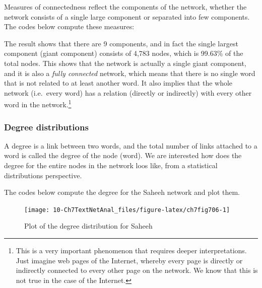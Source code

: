 \documentclass[
]{article}
\newenvironment{Shaded}{\begin{snugshade}}{\end{snugshade}}
\newcommand{\FunctionTok}[1]{\textcolor[rgb]{0.13,0.29,0.53}{\textbf{#1}}}
\newcommand{\NormalTok}[1]{#1}
\newcommand{\OtherTok}[1]{\textcolor[rgb]{0.56,0.35,0.01}{#1}}
\newcommand{\SpecialCharTok}[1]{\textcolor[rgb]{0.81,0.36,0.00}{\textbf{#1}}}
\begin{document}
Measures of connectedness reflect the components of the network, whether the network consists of a single large component or separated into few components. The codes below compute these measures:

\footnotesize

\begin{Shaded}
\end{Shaded}

\normalsize

The result shows that there are 9 components, and in fact the single largest component (giant component) consists of 4,783 nodes, which is 99.63\% of the total nodes. This shows that the network is actually a single giant component, and it is also a \emph{fully connected} network, which means that there is no single word that is not related to at least another word. It also implies that the whole network (i.e.~every word) has a relation (directly or indirectly) with every other word in the network.\footnote{This is a very important phenomenon that requires deeper interpretations. Just imagine web pages of the Internet, whereby every page is directly or indirectly connected to every other page on the network. We know that this is not true in the case of the Internet.}

\hypertarget{degree-distributions-1}{%
\subsubsection{Degree distributions}\label{degree-distributions-1}}

A degree is a link between two words, and the total number of links attached to a word is called the degree of the node (word). We are interested how does the degree for the entire nodes in the network loos like, from a statistical distributions perspective.

The codes below compute the degree for the Saheeh network and plot them.

\begin{figure}

{\centering \texttt{[image: 10-Ch7TextNetAnal\_files/figure-latex/ch7fig706-1]} 

}

\caption{Plot of the degree distribution for Saheeh}\label{fig:ch7fig706}
\end{figure}
\end{document}
